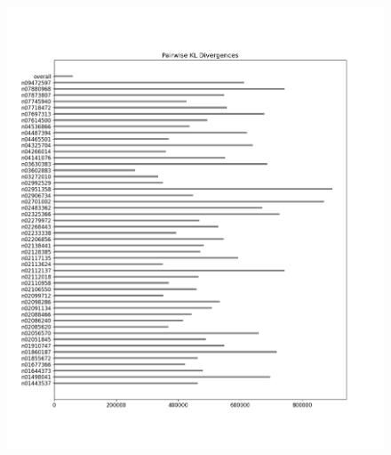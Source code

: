 \documentclass{article}
\begin{document}
\begin{figure}[H]
\begin{minipage}{0.45\textwidth}
        \end{minipage}\hfill
        \begin{minipage}{0.45\textwidth}
            \centering
            \includegraphics[width=\textwidth]{cross_imagenet_imgr_r/alexnet_kl_div_b_to_apairwise.png} %
        \end{minipage}
        \begin{minipage}{0.45\textwidth}
            \centering

\end{minipage}
\end{figure}
\end{document}
